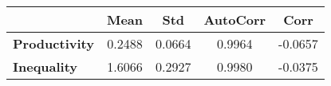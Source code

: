 \begin{tiny}\begin{tabular}{|l|c|c|c|c|}
\hline
&\textbf{Mean}&\textbf{Std}&\textbf{AutoCorr}&\textbf{Corr}\\\hline
\textbf{Productivity}&0.2488&0.0664&0.9964&-0.0657\\\hline
\textbf{Inequality}&1.6066&0.2927&0.9980&-0.0375\\\hline
\end{tabular}
\end{tiny}